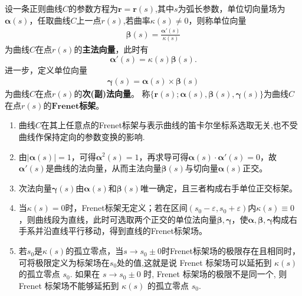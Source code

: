 \documentclass[../../main.tex]{subfiles}%
\begin{document}
\begin{definition}[Frenet标架]\label{definition:Frenet标架的定义}
设一条正则曲线$C$的参数方程为$\bm{r}=\bm{r}(s)$,其中$s$为弧长参数，单位切向量场为$\bm{\alpha}(s)$，任取曲线$C$上一点$r(s)$,若曲率$\kappa(s) \neq 0$，则称单位向量
\begin{align*}
\bm{\beta}(s) = \frac{\bm{\alpha}'(s)}{\kappa(s)}
\end{align*}
为曲线$C$在点$r(s)$的\textbf{主法向量}，此时有
\[
\bm{\alpha}'(s) = \kappa(s)\bm{\beta}(s).
\]
进一步，定义单位向量
\begin{align*}
\bm{\gamma}(s) = \bm{\alpha}(s) \times \bm{\beta}(s)
\end{align*}
为曲线$C$在点$r(s)$的\textbf{次(副)法向量}。
称$\{\bm{r}(s);\bm{\alpha}(s),\bm{\beta}(s),\bm{\gamma}(s)\}$为曲线$C$在点$r(s)$的$\mathbf{Frenet}$\textbf{标架}。
\end{definition}
\begin{remark}
\begin{enumerate}
\item 曲线$C$在其上任意点的Frenet标架与表示曲线的笛卡尔坐标系选取无关,也不受曲线作保持定向的参数变换的影响.

\item 由$|\bm{\alpha}(s)|=1$，可得$\boldsymbol{\alpha }^2\left( s \right) =1$，再求导可得$\bm{\alpha}(s) \cdot \bm{\alpha}'(s)=0$，故$\bm{\alpha}'(s)$是曲线的法向量，从而主法向量$\bm{\beta}(s)$与切向量$\bm{\alpha}(s)$正交。

\item 次法向量$\bm{\gamma}(s)$由$\bm{\alpha}(s)$和$\bm{\beta}(s)$唯一确定，且三者构成右手单位正交标架。

\item 当$\kappa(s)=0$时，Frenet标架无定义；若在区间$(s_0-\varepsilon,s_0+\varepsilon)$内$\kappa(s)\equiv0$，则曲线段为直线，此时可选取两个正交的单位法向量$\bm{\beta},\bm{\gamma}$，使$\bm{\alpha},\bm{\beta},\bm{\gamma}$构成右手系并沿直线平行移动，得到直线的Frenet标架场。
\item 若$s_0$是$\kappa(s)$的孤立零点，当$s \to s_0\pm0$时Frenet标架场的极限存在且相同时，可将极限定义为标架场在$s_0$处的值,这就是说 Frenet 标架场可以延拓到 $\kappa(s)$ 的孤立零点 $s_0$. 如果在 $s \to s_0 \pm 0$ 时, Frenet 标架场的极限不是同一个, 则 Frenet 标架场不能够延拓到 $\kappa(s)$ 的孤立零点 $s_0$.
\end{enumerate}
\end{remark}
\end{document}

